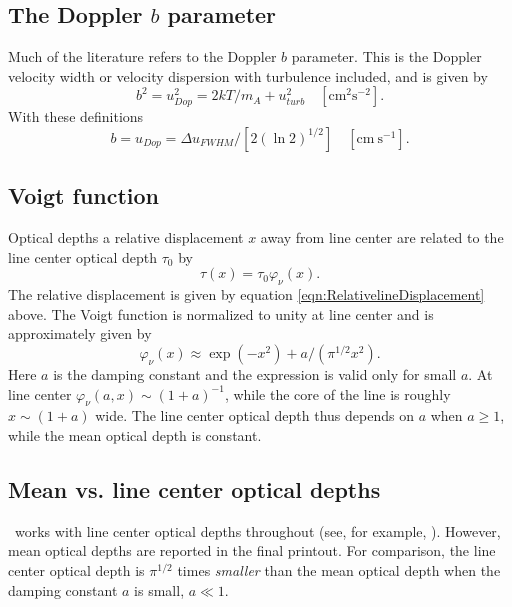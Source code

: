 \subsection{The Doppler $b$ parameter}

Much of the literature refers to the Doppler $b$ parameter.
This is the
Doppler velocity width or velocity dispersion with turbulence included,
and is given by
\begin{equation}
{b^2} = u_{Dop}^2 = 2kT/{m_A} + u_{turb}^2
\quad [\mathrm{cm}^2 \mathrm{s}^{-2}].
\end{equation}
With these definitions
\begin{equation}
b = {u_{Dop}} = \Delta {u_{FWHM}}/\left[ {2{{\left( {\ln 2} \right)}^{1/2}}}
\right]
\quad  [\mathrm{cm~s}^{-1}].
\end{equation}

\subsection{Voigt function}

Optical depths a relative displacement $x$ away from line center
are related
to the line center optical depth $\tau_0$ by
\begin{equation}
\tau (x)=\tau_0 \varphi_\nu (x).%
\end{equation}
The relative displacement is given by
equation \ref{eqn:RelativelineDisplacement} above.
The Voigt function
is normalized to unity at line center and is approximately given by
\begin{equation}
\label{eqn:VoigtFunctionApproximation}
{\varphi _\nu }(x) \approx \exp ( - {x^2}) + a/({\pi ^{1/2}}{x^2}) .
\end{equation}
Here $a$ is the damping constant and the expression is valid only
for small $a$.
At line center 
${\varphi _\nu }\left( {a,x} \right) \sim \left( {1 + a} \right)^{ - 1}$,
while the core of the line is roughly $x \sim \left( {1 + a} \right)$ wide.
The line center optical depth thus depends on $a$ when $a\geq 1$,
while the mean optical depth is constant.

\subsection{Mean vs. line center optical depths}

\Cloudy\ works with line center optical depths throughout (see,
for example, \citealp{Mihalas1978}).
However, mean optical depths are reported in the final printout.
For comparison, the line
center optical depth is $\pi^{1/2}$ times \emph{smaller} than
the mean optical depth when the damping constant $a$ is small, $a\ll1$.

